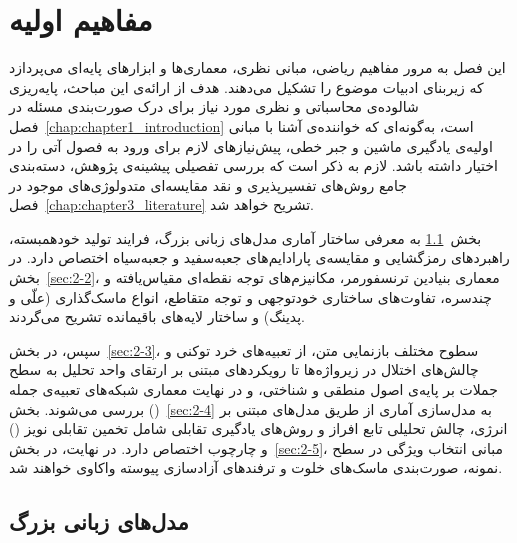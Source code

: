
\chapter{مفاهیم اولیه}\label{chap:chapter2_preliminaries}

این فصل به مرور مفاهیم ریاضی، مبانی نظری، معماری‌ها و ابزارهای پایه‌ای می‌پردازد که زیربنای ادبیات موضوع را تشکیل می‌دهند. هدف از ارائه‌ی این مباحث، پایه‌ریزی شالوده‌ی محاسباتی و نظری مورد نیاز برای درک صورت‌بندی مسئله در فصل~\ref{chap:chapter1_introduction} است، به‌گونه‌ای که خواننده‌ی آشنا با مبانی اولیه‌ی یادگیری ماشین و جبر خطی، پیش‌نیازهای لازم برای ورود به فصول آتی را در اختیار داشته باشد. لازم به ذکر است که بررسی تفصیلی پیشینه‌ی پژوهش، دسته‌بندی جامع روش‌های تفسیرپذیری و نقد مقایسه‌ای متدولوژی‌های موجود در فصل~\ref{chap:chapter3_literature} تشریح خواهد شد.

بخش~\ref{sec:2-1} به معرفی ساختار آماری مدل‌های زبانی بزرگ، فرایند تولید خودهمبسته، راهبردهای رمزگشایی و مقایسه‌ی پارادایم‌های جعبه‌سفید و جعبه‌سیاه اختصاص دارد. در بخش~\ref{sec:2-2}، معماری بنیادین ترنسفورمر، مکانیزم‌های توجه نقطه‌ای مقیاس‌یافته و چندسره، تفاوت‌های ساختاری خودتوجهی و توجه متقاطع، انواع ماسک‌گذاری (علّی و پدینگ) و ساختار لایه‌های باقیمانده تشریح می‌گردند.

سپس، در بخش~\ref{sec:2-3}، سطوح مختلف بازنمایی متن، از تعبیه‌های خرد توکنی و چالش‌های اختلال در زیرواژه‌ها تا رویکردهای مبتنی بر ارتقای واحد تحلیل به سطح جملات بر پایه‌ی اصول منطقی و شناختی، و در نهایت معماری شبکه‌های تعبیه‌ی جمله () بررسی می‌شوند. بخش~\ref{sec:2-4} به مدل‌سازی آماری از طریق مدل‌های مبتنی بر انرژی، چالش تحلیلی تابع افراز و روش‌های یادگیری تقابلی شامل تخمین تقابلی نویز () و چارچوب  اختصاص دارد. در نهایت، در بخش~\ref{sec:2-5}، مبانی انتخاب ویژگی در سطح نمونه، صورت‌بندی ماسک‌های خلوت و ترفندهای آزادسازی پیوسته واکاوی خواهند شد.



\section{مدل‌های زبانی بزرگ}\label{sec:2-1}

